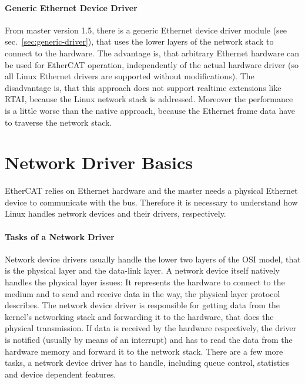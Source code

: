 \documentclass[a4paper,12pt,BCOR6mm,bibtotoc,idxtotoc]{scrbook}
\begin{document}
\paragraph{Generic Ethernet Device Driver} From master version 1.5, there is a
generic Ethernet device driver module (see sec.~\ref{sec:generic-driver}),
that uses the lower layers of the network stack to connect to the hardware.
The advantage is, that arbitrary Ethernet hardware can be used for EtherCAT
operation, independently of the actual hardware driver (so all Linux Ethernet
drivers are supported without modifications). The disadvantage is, that this
approach does not support realtime extensions like RTAI, because the Linux
network stack is addressed. Moreover the performance is a little worse than
the native approach, because the Ethernet frame data have to traverse the
network stack.


\section{Network Driver Basics}
\label{sec:networkdrivers}

EtherCAT relies on Ethernet hardware and the master needs a physical
Ethernet device to communicate with the bus. Therefore it is necessary
to understand how Linux handles network devices and their drivers,
respectively.

\paragraph{Tasks of a Network Driver} Network device drivers usually handle
the lower two layers of the OSI model, that is the physical layer and the
data-link layer. A network device itself natively handles the physical layer
issues: It represents the hardware to connect to the medium and to send and
receive data in the way, the physical layer protocol describes. The network
device driver is responsible for getting data from the kernel's networking
stack and forwarding it to the hardware, that does the physical transmission.
If data is received by the hardware respectively, the driver is notified
(usually by means of an interrupt) and has to read the data from the hardware
memory and forward it to the network stack. There are a few more tasks, a
network device driver has to handle, including queue control, statistics and
device dependent features.
\end{document}
